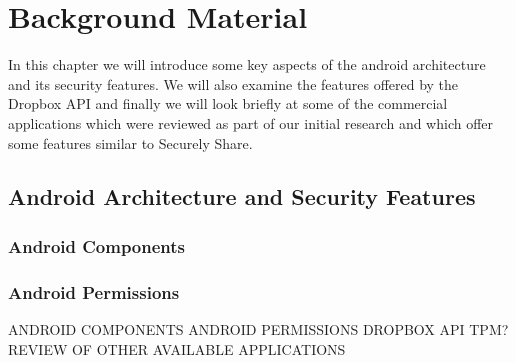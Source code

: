 
\chapter{Background Material}
\label{cha:background}

In this chapter we will introduce some key aspects of the android architecture and its security features.  We will also examine the features offered by the Dropbox API and finally we will look briefly at some of the commercial applications which were reviewed as part of our initial research and which offer some features similar to Securely Share.

\section{Android Architecture and Security Features}
\subsection{Android Components}
\subsection{Android Permissions}

ANDROID COMPONENTS
ANDROID PERMISSIONS
DROPBOX API
TPM?
REVIEW OF OTHER AVAILABLE APPLICATIONS

